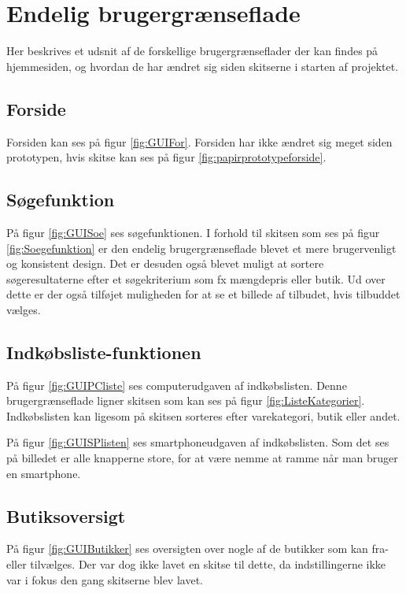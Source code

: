 \section{Endelig brugergrænseflade}
Her beskrives et udsnit af de forskellige brugergrænseflader der kan findes på hjemmesiden, og hvordan de har ændret sig siden skitserne i starten af projektet.

\subsection{Forside}
Forsiden kan ses på figur \ref{fig:GUIFor}. Forsiden har ikke ændret sig meget siden prototypen, hvis skitse kan ses på figur \ref{fig:papirprototypeforside}. 

\subsection{Søgefunktion}
På figur \ref{fig:GUISoe} ses søgefunktionen. I forhold til skitsen som ses på figur \ref{fig:Soegefunktion} er den endelig brugergrænseflade blevet et mere brugervenligt og konsistent design. Det er desuden også blevet muligt at sortere søgeresultaterne efter et søgekriterium som fx mængdepris eller butik. Ud over dette er der også tilføjet muligheden for at se et billede af tilbudet, hvis tilbuddet vælges.

\subsection{Indkøbsliste-funktionen}
På figur \ref{fig:GUIPCliste} ses computerudgaven af indkøbslisten. Denne brugergrænseflade ligner skitsen som kan ses på figur \ref{fig:ListeKategorier}. Indkøbslisten kan ligesom på skitsen sorteres efter varekategori, butik eller andet.

På figur \ref{fig:GUISPlisten} ses smartphoneudgaven af indkøbslisten. Som det ses på billedet er alle knapperne store, for at være nemme at ramme når man bruger en smartphone.

\subsection{Butiksoversigt}
På figur \ref{fig:GUIButikker} ses oversigten over nogle af de butikker som kan fra- eller tilvælges. Der var dog ikke lavet en skitse til dette, da indstillingerne ikke var i fokus den gang skitserne blev lavet.
